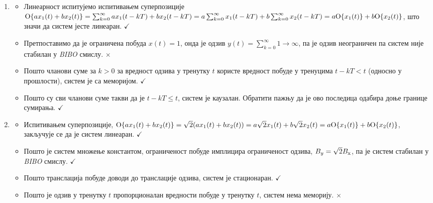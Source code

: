 \begin{enumerate}[label=(\alph*)]
    \item
    \begin{itemize}
    \item Линеарност испитујемо испитивањем суперпозиције
    ${\rm O}\{ a x_1(t) + b x_2(t) \} = \sum_{k = 0}^{\infty} ax_1(t-kT) + bx_2(t-kT) = 
    a \sum_{k = 0}^{\infty} x_1(t-kT) + b  \sum_{k = 0}^{\infty} x_2(t-kT) = a {\rm O}\{x_1(t)\} + b {\rm O}\{x_2(t)\}$,
    што значи да систем јесте линеаран.  \hfill $\checkmark$

    \item Претпоставимо да је ограничена побуда $x(t) = 1$, онда је одзив $y(t) = \sum_{k = 0}^{\infty} 1 \to \infty$, 
    па је одзив неограничен па систем није стабилан у \textit{BIBO} смислу. \hfill $\times$

    \item Пошто чланови суме за $k > 0$ за вредност одзива у тренутку $t$ користе вредност побуде у тренуцима $t - kT < t$
    (односно у прошлости), систем је са меморијом. \hfill $\checkmark$
    
    \item Пошто су сви чланови суме такви да је $t - kT \leq t$, систем је каузалан. Обратити пажњу да је ово 
    последица одабира доње границе сумирања.  \hfill $\checkmark$
    \end{itemize}

    \item
    \begin{itemize}
        \item Испитивањем суперпозиције, ${\rm O}\{ a x_1(t) + b x_2(t) \} = \sqrt2 (ax_1(t) + bx_2(t)) = 
        a \sqrt 2 x_1(t) + b \sqrt 2 x_2(t)
        = a {\rm O}\{x_1(t)\} + b {\rm O}\{x_2(t)\}$, закључује се да је систем линеаран. \hfill $\checkmark$

        \item Пошто је систем множење константом, ограниченост побуде имплицира ограниченост одзива,
        $B_{y} = \sqrt 2 B_{\rm x}$, па је систем стабилан у \textit{BIBO} смислу. \hfill $\checkmark$

        \item Пошто транслација побуде доводи до транслације одзива, систем је стационаран. \hfill $\checkmark$

        \item Пошто је одзив у тренутку $t$ пропорционалан вредности побуде у тренутку $t$, систем нема меморију. \hfill $\times$
        

\end{itemize}
\end{enumerate}
